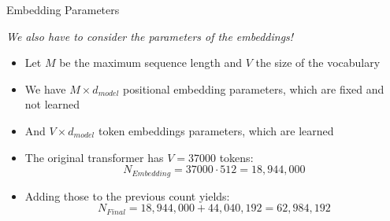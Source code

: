 \documentclass[11pt,compress,t,notes=noshow, xcolor=table]{beamer}
\begin{document}
\begin{frame}{Embedding Parameters}

\textit{We also have to consider the parameters of the embeddings!}

\begin{itemize}
    \item Let $M$ be the maximum sequence length and $V$ the size of the vocabulary
    \item We have $M \times d_{model}$ positional embedding parameters, which are fixed and not learned
    \item And $V \times d_{model}$ token embeddings parameters, which are learned
    \item The original transformer has $V = 37000$ tokens:
			$$N_{Embedding} = 37000 \cdot 512 = 18,944,000$$
		\item Adding those to the previous count yields:
			$$N_{Final} = 18,944,000 + 44,040,192 = 62,984,192$$ 

\end{itemize}
    
\end{frame}




\endlecture
\end{document}
